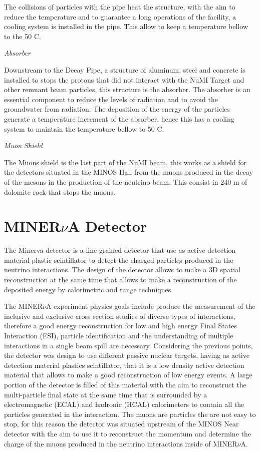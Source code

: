 The collisions of particles with the pipe heat the structure, with the aim to reduce the temperature and to guarantee a long operations of the facility, a cooling system is installed in the pipe. This allow to keep a temperature bellow to the 50 C. 

\textit{Absorber}

Downstream to the Decay Pipe, a structure of aluminum, steel and concrete is installed to stops the protons that did not interact with the NuMI Target and other remnant beam particles, this structure is the absorber. The absorber is an essential component to reduce the levels of radiation and to avoid the groundwater from radiation. The deposition of the energy of the particles generate a temperature increment of the absorber, hence this has a cooling system to maintain the temperature bellow to 50 C. 

\textit{Muon Shield} 

The Muons shield is the last part of the NuMI beam, this works as a shield for the detectors situated in the MINOS Hall from the muons produced in the decay of the mesons in the production of the neutrino beam. This consist in 240 m of dolomite rock that stops the muons. 

\pagebreak



\section{MINER$\nu$A Detector}
\label{Cap:MnvExp:MnvDetector}

The Minerva detector is a fine-grained detector that use as active detection material plastic scintillator to detect the charged particles produced in the neutrino interactions. The design of the detector allows to make a 3D spatial reconstruction at the same time that allows to make a reconstruction of the deposited energy by calorimetric and range techniques. 

The MINER$\nu$A experiment physics goals include produce the measurement of the inclusive and exclusive cross section studies of diverse types of interactions, therefore a good energy reconstruction for low and high energy Final States Interaction (FSI), particle identification and the understanding of multiple interactions in a single beam spill are necessary. Considering the previous points, the detector was design to use different passive nuclear targets, having as active detection material plastics scintillator, that it is a low density active detection material that allows to make a good reconstruction of low energy events. A large portion of the detector is filled of this material with the aim to reconstruct the multi-particle final state at the same time that is surrounded by a electromagnetic (ECAL) and hadronic (HCAL) calorimeters to contain all the particles generated in the interaction. The muons are particles the are not easy to stop, for this reason the detector was situated upstream of the MINOS Near detector with the aim to use it to reconstruct the momentum and determine the charge of the muons produced in the neutrino interactions inside of MINER$\nu$A.


